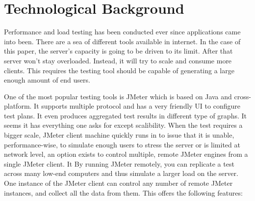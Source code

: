\chapter{Technological Background}
Performance and load testing has been conducted ever since applications came into been. There are a sea of different tools available in internet. In the case of this paper, the server's capacity is going to be driven to its limit. After that server won't stay overloaded. Instead, it will try to scale and consume more clients. This requires the testing tool should be capable of generating a large enough amount of end users. 

One of the most popular testing tools is JMeter which is based on Java and cross-platform. It supports multiple protocol and has a very friendly UI to configure test plans. It even produces aggregated test results in different type of graphs. It seems it has everything one asks for except scalibility. When the test requires a bigger scale, JMeter client machine quickly runs in to issue that it is unable, performance-wise, to simulate enough users to stress the server or is limited at network level, an option exists to control multiple, remote JMeter engines from a single JMeter client. It By running JMeter remotely, you can replicate a test across many low-end computers and thus simulate a larger load on the server. One instance of the JMeter client can control any number of remote JMeter instances, and collect all the data from them. This offers the following features:

  
